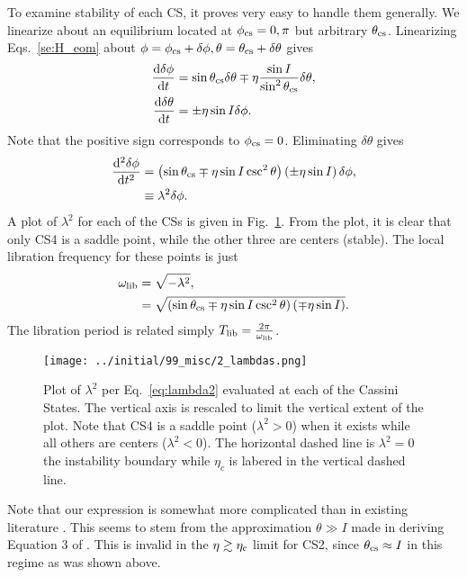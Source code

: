 \documentclass[
        fleqn,
        usenatbib,
        referee,
    ]{mnras}
\newcommand*{\rd}[2]{\frac{\mathrm{d}#1}{\mathrm{d}#2}}
\newcommand*{\rtd}[2]{\frac{\mathrm{d}^2#1}{\mathrm{d}#2^2}}
\newcommand*{\p}[1]{\left(#1\right)}
\begin{document}
To examine stability of each CS, it proves very easy to handle them generally.
We linearize about an equilibrium located at $\phi_{\rm cs} = 0, \pi$ but
arbitrary $\theta_{\rm cs}$. Linearizing Eqs.~\eqref{se:H_eom} about $\phi =
\phi_{\rm cs} + \delta \phi, \theta = \theta_{\rm cs} + \delta \theta$ gives
\begin{subequations}\label{se:H_eom_lin}
    \begin{align}
        \rd{\delta \phi}{t} &= \sin \theta_{\rm cs} \delta \theta
            \mp \eta \frac{\sin I}{\sin^2\theta_{\rm cs}} \delta \theta,\\
        \rd{\delta \theta}{t} &= \pm \eta \sin I \delta \phi.
    \end{align}
\end{subequations}
Note that the positive sign corresponds to $\phi_{\rm cs} = 0$. Eliminating
$\delta \theta$ gives
\begin{align}
    \rtd{\delta \phi}{t} &= \p{\sin \theta_{\rm cs}
        \mp \eta \sin I\csc^2\theta}\p{\pm \eta \sin I} \delta
            \phi,\\
        &\equiv \lambda^2\delta \phi.\label{eq:lambda2}
\end{align}
A plot of $\lambda^2$ for each of the CSs is given in Fig.~\ref{fig:lambda2}.
From the plot, it is clear that only CS4 is a saddle point, while the other
three are centers (stable). The local libration frequency for these points is
just
\begin{align}
    \omega_{\rm lib} &= \sqrt{-\lambda^2},\\
        &= \sqrt{\p{\sin \theta_{\rm cs}
            \mp \eta \sin I \csc^2\theta}\p{\mp \eta \sin I}}.
\end{align}
The libration period is related simply $T_{\rm lib} = \frac{2\pi}{\omega_{\rm
lib}}$.
\begin{figure}[t]
    \centering
    \texttt{[image: ../initial/99\_misc/2\_lambdas.png]}
    \caption{Plot of $\lambda^2$ per Eq.~\eqref{eq:lambda2} evaluated at each
    of the Cassini States. The vertical axis is rescaled to limit the vertical
    extent of the plot. Note that CS4 is a saddle point ($\lambda^2 > 0$) when
    it exists while all others are centers ($\lambda^2 < 0$). The horizontal
    dashed line is $\lambda^2 = 0$ the instability boundary while $\eta_c$ is
    labered in the vertical dashed line.}\label{fig:lambda2}
\end{figure}

Note that our expression is somewhat more complicated than in existing
literature \citep{millholland_disk,ward2004II}. This seems to stem from the
approximation $\theta \gg I$ made in deriving Equation 3 of
\citet{ward2004II}. This is invalid in the $\eta \gtrsim \eta_{\rm c}$ limit for
CS2, since $\theta_{\rm cs} \approx I$ in this regime as was shown above.
\end{document}
